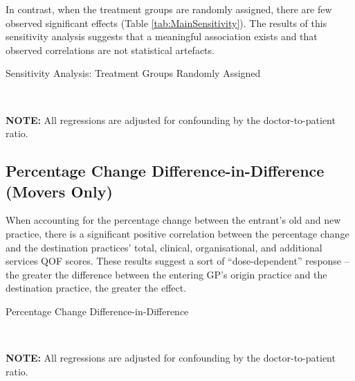 \documentclass[11pt]{article}
\begin{document}
In contrast, when the treatment groups are randomly assigned, there are few observed significant effects (Table \ref{tab:MainSensitivity}). The results of this sensitivity analysis suggests that a meaningful association exists and that observed correlations are not statistical artefacts.

\begin{landscape}
  \begin{table}[htp]
  \caption{Sensitivity Analysis: Treatment Groups Randomly Assigned}
    \begin{threeparttable}
      \\
    \begin{tablenotes}
    \footnotesize
    \textbf{NOTE:} All regressions are adjusted for confounding by the doctor-to-patient ratio.
    \end{tablenotes}
    \end{threeparttable}
    \label{tab:MainSensitivity}
  \end{table}
\end{landscape}




\subsection{Percentage Change Difference-in-Difference (Movers Only)}

When accounting for the percentage change between the entrant's old and new practice, there is a significant positive correlation between the percentage change and the destination practices' total, clinical, organisational, and additional services QOF scores. These results suggest a sort of ``dose-dependent'' response -- the greater the difference between the entering GP's origin practice and the destination practice, the greater the effect.

\begin{landscape}
  \begin{table}[htp]
  \caption{Percentage Change Difference-in-Difference}
    \begin{threeparttable}
      \\
    \begin{tablenotes}
    \footnotesize
    \textbf{NOTE:} All regressions are adjusted for confounding by the doctor-to-patient ratio.
    \end{tablenotes}
    \end{threeparttable}
    \label{tab:PctChangeDD}
  \end{table}
\end{landscape}
\end{document}

